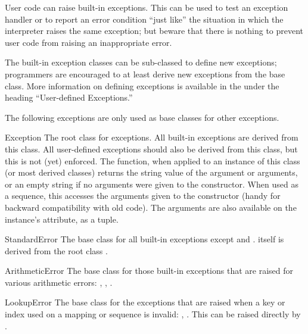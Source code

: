 User code can raise built-in exceptions.  This can be used to test an
exception handler or to report an error condition ``just like'' the
situation in which the interpreter raises the same exception; but
beware that there is nothing to prevent user code from raising an
inappropriate error.

The built-in exception classes can be sub-classed to define new
exceptions; programmers are encouraged to at least derive new
exceptions from the  base class.  More
information on defining exceptions is available in the
 under the heading
``User-defined Exceptions.''


The following exceptions are only used as base classes for other
exceptions.

\begin{excdesc}{Exception}
The root class for exceptions.  All built-in exceptions are derived
from this class.  All user-defined exceptions should also be derived
from this class, but this is not (yet) enforced.  The 
function, when applied to an instance of this class (or most derived
classes) returns the string value of the argument or arguments, or an
empty string if no arguments were given to the constructor.  When used
as a sequence, this accesses the arguments given to the constructor
(handy for backward compatibility with old code).  The arguments are
also available on the instance's  attribute, as a tuple.
\end{excdesc}

\begin{excdesc}{StandardError}
The base class for all built-in exceptions except
 and .
 itself is derived from the root class
.
\end{excdesc}

\begin{excdesc}{ArithmeticError}
The base class for those built-in exceptions that are raised for
various arithmetic errors: ,
, .
\end{excdesc}

\begin{excdesc}{LookupError}
The base class for the exceptions that are raised when a key or
index used on a mapping or sequence is invalid: ,
.  This can be raised directly by
.
\end{excdesc}

